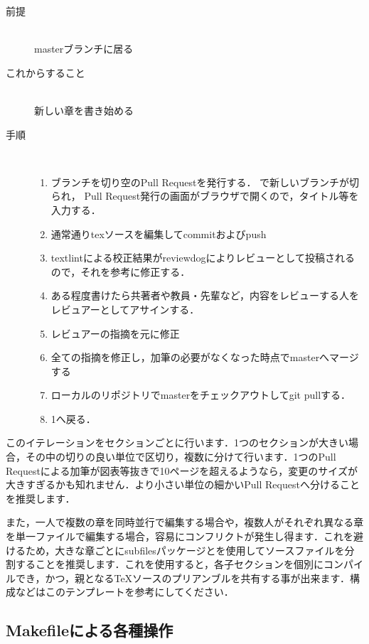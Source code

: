 \documentclass[main]{subfiles}
\begin{document}
\begin{description}
    \item[前提]　\\
        masterブランチに居る
    \item[これからすること]　\\
        新しい章を書き始める
    \item[手順]　\\
        \begin{enumerate}
            \item ブランチを切り空のPull Requestを発行する．
                で新しいブランチが切られ，
                Pull Request発行の画面がブラウザで開くので，タイトル等を入力する．
            \item 通常通りtexソースを編集してcommitおよびpush
            \item textlintによる校正結果がreviewdogによりレビューとして投稿されるので，それを参考に修正する．
            \item ある程度書けたら共著者や教員・先輩など，内容をレビューする人をレビュアーとしてアサインする．
            \item レビュアーの指摘を元に修正
            \item 全ての指摘を修正し，加筆の必要がなくなった時点でmasterへマージする
            \item ローカルのリポジトリでmasterをチェックアウトしてgit pullする．
            \item 1へ戻る．
        \end{enumerate}
\end{description}

このイテレーションをセクションごとに行います．1つのセクションが大きい場合，その中の切りの良い単位で区切り，複数に分けて行います．1つのPull Requestによる加筆が図表等抜きで10ページを超えるようなら，変更のサイズが大きすぎるかも知れません．より小さい単位の細かいPull Requestへ分けることを推奨します．

また，一人で複数の章を同時並行で編集する場合や，複数人がそれぞれ異なる章を単一ファイルで編集する場合，容易にコンフリクトが発生し得ます．これを避けるため，大きな章ごとにsubfilesパッケージとを使用してソースファイルを分割することを推奨します．これを使用すると，各子セクションを個別にコンパイルでき，かつ，親となるTeXソースのプリアンブルを共有する事が出来ます．構成などはこのテンプレートを参考にしてください．

\subsection{Makefileによる各種操作}
\end{document}
